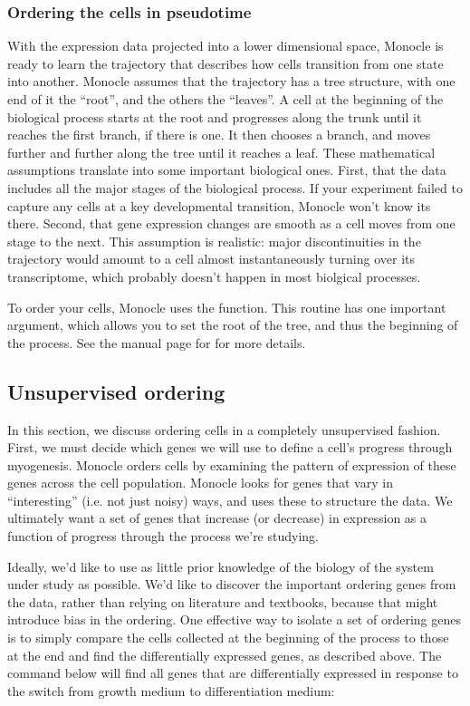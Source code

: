 \documentclass[10pt,oneside]{article}\usepackage[]{graphicx}\usepackage[]{color}
\begin{document}
 \subsubsection{Ordering the cells in pseudotime}
 With the expression data projected into a lower dimensional space, Monocle is ready to learn the trajectory that describes how cells transition from one state into another. Monocle assumes that the trajectory has a tree structure, with one end of it the ``root'', and the others the ``leaves''. A cell at the beginning of the biological process starts at the root and progresses along the trunk until it reaches the first branch, if there is one. It then chooses a branch, and moves further and further along the tree until it reaches a leaf. These mathematical assumptions translate into some important biological ones. First, that the data includes all the major stages of the biological process. If your experiment failed to capture any cells at a key developmental transition, Monocle won't know its there. Second, that gene expression changes are smooth as a cell moves from one stage to the next. This assumption is realistic: major discontinuities in the trajectory would amount to a cell almost instantaneously turning over its transcriptome, which probably doesn't happen in most biolgical processes.
 
 To order your cells, Monocle uses the  function. This routine has one important argument, which allows you to set the root of the tree, and thus the beginning of the process. See the manual page for  for more details.
 
 \subsection{Unsupervised ordering}
 
 In this section, we discuss ordering cells in a completely unsupervised fashion. First, we must decide which genes we will use to define a cell's progress through myogenesis. Monocle orders cells by examining the pattern of expression of these genes across the cell population. Monocle looks for genes that vary in ``interesting'' (i.e. not just noisy) ways, and uses these to structure the data. We ultimately want a set of genes that increase (or decrease) in expression as a function of progress through the process we're studying. 
 
 Ideally, we'd like to use as little prior knowledge of the biology of the system under study as possible. We'd like to discover the important ordering genes from the data, rather than relying on literature and textbooks, because that might introduce bias in the ordering. One effective way to isolate a set of ordering genes is to simply compare the cells collected at the beginning of the process to those at the end and find the differentially expressed genes, as described above. The command below will find all genes that are differentially expressed in response to the switch from growth medium to differentiation medium:
 
\end{document}
